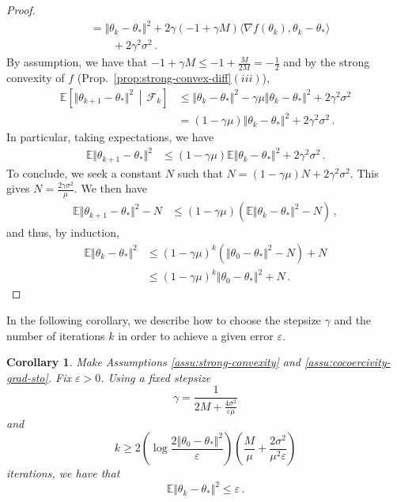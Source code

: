 \documentclass[11pt,reqno]{article}
\newcommand{\E}{\mathbb{E}}
\newcommand{\cF}{\mathcal{F}}
\renewcommand{\leq}{\leqslant}
\renewcommand{\geq}{\geqslant}
\numberwithin{equation}{section}
\theoremstyle{plain}
\newtheorem{coro}[assumption]{Corollary}
\theoremstyle{definition}
\theoremstyle{remark}
\begin{document}
\begin{proof}
\begin{align*}
	&= \Vert \theta_k - \theta_* \Vert^2 + 2\gamma (-1+ \gamma M) \langle \nabla f(\theta_k), \theta_k - \theta_* \rangle \\
	&\qquad+ 2\gamma^2 \sigma^2 \, .
\end{align*}
By assumption, we have that $-1+\gamma M \leq -1 + \frac{M}{2M} = -\frac{1}{2}$ and by the strong convexity of $f$ (Prop.~\ref{prop:strong-convex-diff}$(iii)$), 
\begin{align*}
	\E \left[\Vert \theta_{k+1} - \theta_* \Vert^2 \, \middle\vert \, \cF_k\right] 
	&\leq \Vert \theta_k - \theta_* \Vert^2 -\gamma \mu \Vert \theta_k - \theta_* \Vert^2 + 2\gamma^2 \sigma^2 \\
	&= (1-\gamma\mu ) \Vert \theta_k - \theta_* \Vert^2  + 2\gamma^2 \sigma^2 \, .
\end{align*}
In particular, taking expectations, we have 
\begin{align*}
	\E \Vert \theta_{k+1} - \theta_* \Vert^2  &\leq (1-\gamma\mu ) \E \Vert \theta_k - \theta_* \Vert^2  + 2\gamma^2 \sigma^2 \, .
\end{align*}
To conclude, we seek a constant $N$ such that $N = (1-\gamma\mu ) N + 2\gamma^2 \sigma^2$. This gives $N = \frac{2\gamma \sigma^2}{\mu}$. We then have 
\begin{align*}
	\E \Vert \theta_{k+1} - \theta_* \Vert^2  - N &\leq (1-\gamma\mu ) \left(\E \Vert \theta_k - \theta_* \Vert^2  - N \right) \, , 
\end{align*}
and thus, by induction, 
\begin{align*}
	\E \Vert \theta_{k} - \theta_* \Vert^2  &\leq (1-\gamma\mu )^k \left(\Vert \theta_0 - \theta_* \Vert^2 - N \right) + N \\
	&\leq (1-\gamma\mu )^k \Vert \theta_0 - \theta_* \Vert^2  + N \, .
\end{align*}
\end{proof}

In the following corollary, we describe how to choose the stepsize $\gamma$ and the number of iterations $k$ in order to achieve a given error $\varepsilon$.

\begin{coro}
	\label{coro:sgd}
	Make Assumptions \ref{assu:strong-convexity} and \ref{assu:cocoercivity-grad-sto}. Fix $\varepsilon > 0$. Using a fixed stepsize 
	\begin{equation*}
		\gamma = \frac{1}{2M + \frac{4\sigma^2}{\varepsilon\mu}} 
	\end{equation*}
	and 
	\begin{equation*}
		k \geq 2 \left(\log \frac{2 \Vert \theta_0 - \theta_* \Vert^2}{\varepsilon}\right) \left(\frac{M}{\mu} + \frac{2\sigma^2}{\mu^2 \varepsilon}\right)
	\end{equation*}
	iterations, we have that 
	\begin{equation*}
		\E \Vert \theta_k - \theta_* \Vert^2 \leq \varepsilon \, .
	\end{equation*}
\end{coro}
\end{document}
